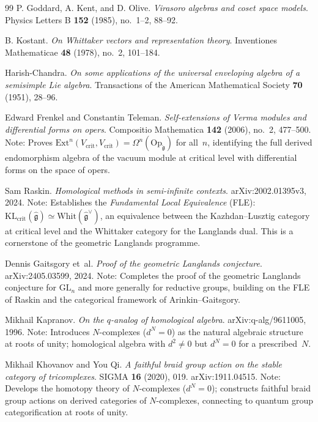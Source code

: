 \begin{thebibliography}{99}
P. Goddard, A. Kent, and D. Olive.
\textit{Virasoro algebras and coset space models}.
Physics Letters B \textbf{152} (1985), no.~1--2, 88--92.

B. Kostant.
\textit{On Whittaker vectors and representation theory}.
Inventiones Mathematicae \textbf{48} (1978), no.~2, 101--184.

Harish-Chandra.
\textit{On some applications of the universal enveloping algebra of a semisimple Lie algebra}.
Transactions of the American Mathematical Society \textbf{70} (1951), 28--96.


Edward Frenkel and Constantin Teleman.
\textit{Self-extensions of Verma modules and differential forms on opers}.
Compositio Mathematica \textbf{142} (2006), no.~2, 477--500.
Note: Proves $\mathrm{Ext}^n(V_{\mathrm{crit}}, V_{\mathrm{crit}}) = \Omega^n(\mathrm{Op}_{\check{\mathfrak{g}}})$ for all~$n$,
identifying the full derived endomorphism algebra of the vacuum module at critical level
with differential forms on the space of opers.

Sam Raskin.
\textit{Homological methods in semi-infinite contexts}.
arXiv:2002.01395v3, 2024.
Note: Establishes the \emph{Fundamental Local Equivalence} (FLE):
$\mathrm{KL}_{\mathrm{crit}}(\widehat{\mathfrak{g}}) \simeq \mathrm{Whit}(\widehat{\mathfrak{g}}^\vee)$,
an equivalence between the Kazhdan--Lusztig category at critical level and the
Whittaker category for the Langlands dual.  This is a cornerstone of the
geometric Langlands programme.

Dennis Gaitsgory et~al.
\textit{Proof of the geometric Langlands conjecture}.
arXiv:2405.03599, 2024.
Note: Completes the proof of the geometric Langlands conjecture for $\mathrm{GL}_n$
and more generally for reductive groups, building on the FLE of Raskin
and the categorical framework of Arinkin--Gaitsgory.


Mikhail Kapranov.
\textit{On the $q$-analog of homological algebra}.
arXiv:q-alg/9611005, 1996.
Note: Introduces $N$-complexes ($d^N = 0$) as the natural algebraic
structure at roots of unity; homological algebra with $d^2 \neq 0$
but $d^N = 0$ for a prescribed~$N$.

Mikhail Khovanov and You Qi.
\textit{A faithful braid group action on the stable category of tricomplexes}.
SIGMA \textbf{16} (2020), 019.
arXiv:1911.04515.
Note: Develops the homotopy theory of $N$-complexes ($d^N = 0$);
constructs faithful braid group actions on derived categories of
$N$-complexes, connecting to quantum group categorification at
roots of unity.



\end{thebibliography}
